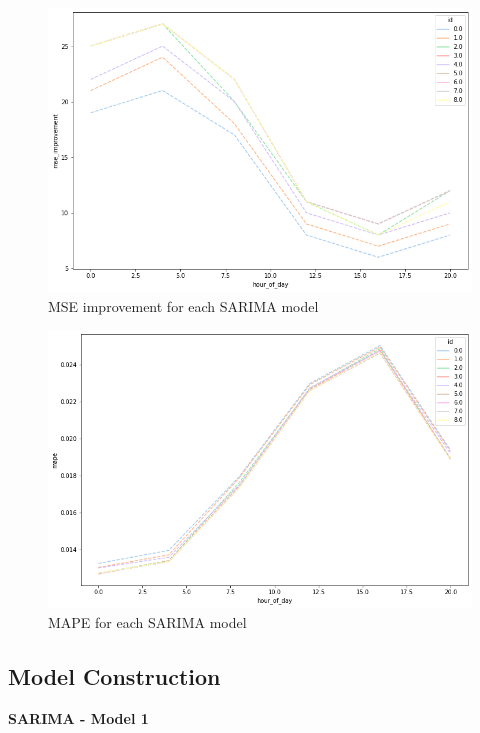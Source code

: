 \documentclass[mstat,12pt]{unswthesis}
\begin{document}
\begin{figure}
\includegraphics[width=1\linewidth,height=0.3\textheight]{images/MSEarima} \caption{MSE improvement for each SARIMA model}\label{fig:MSEsarima}
\end{figure}

\begin{figure}
\includegraphics[width=1\linewidth,height=0.3\textheight]{images/MAPEtuning} \caption{MAPE for each SARIMA model}\label{fig:MAPEsarima}
\end{figure}

\subsection{Model Construction}\label{model-construction-1}

\textbf{SARIMA - Model 1}

\bigskip
\end{document}
